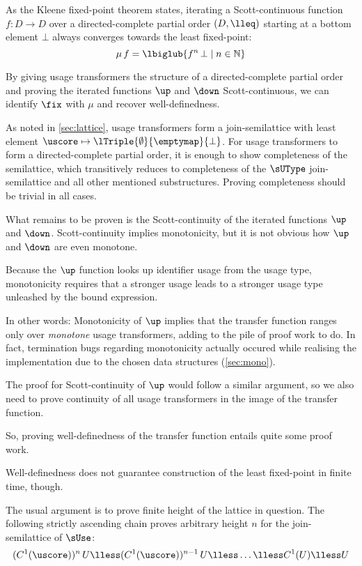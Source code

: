 As the Kleene fixed-point theorem states, iterating a Scott-continuous function $f \colon D \to D$ over a directed-complete partial order $(D, \lleq)$ starting at a bottom element $\bot$ always converges towards the least fixed-point:
\[
  \mu\,f = \lbiglub \{f^n\,\bot \mid n \in \mathbb{N} \}
\]

By giving usage transformers the structure of a directed-complete partial order and proving the iterated functions $\up$ and $\down$ Scott-continuous, we can identify $\fix$ with $\mu$ and recover well-definedness.\smallskip

As noted in \cref{sec:lattice}, usage transformers form a join-semilattice with least element $\uscore \mapsto \lTriple{\emptyset}{\emptymap}{\bot}$.
For usage transformers to form a directed-complete partial order, it is enough to show completeness of the semilattice, which transitively reduces to completeness of the $\sUType$ join-semilattice and all other mentioned substructures.
Proving completeness should be trivial in all cases.

What remains to be proven is the Scott-continuity of the iterated functions $\up$ and $\down$.
Scott-continuity implies monotonicity, but it is not obvious how $\up$ and $\down$ are even monotone.

Because the $\up$ function looks up identifier usage from the usage type, monotonicity requires that a stronger usage leads to a stronger usage type unleashed by the bound expression.

In other words: Monotonicity of $\up$ implies that the transfer function ranges only over \emph{monotone} usage transformers, adding to the pile of proof work to do. 
In fact, termination bugs regarding monotonicity actually occured while realising the implementation due to the chosen data structures (\cf \cref{sec:mono}).

The proof for Scott-continuity of $\up$ would follow a similar argument, so we also need to prove continuity of all usage transformers in the image of the transfer function.

So, proving well-definedness of the transfer function entails quite some proof work.\medskip

Well-definedness does not guarantee construction of the least fixed-point in finite time, though.

The usual argument is to prove finite height of the lattice in question.
The following strictly ascending chain proves arbitrary height $n$ for the join-semilattice of $\sUse$:
\[
  (C^1(\uscore))^n\,U \lless (C^1(\uscore))^{n-1}\,U \lless \ldots \lless C^1(U) \lless U
\]

